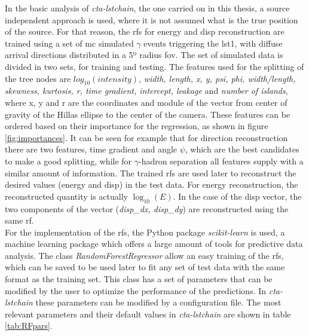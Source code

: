 \documentclass[main.tex]{subfiles}
\begin{document}
In the basic analysis of \textit{cta-lstchain}, the one carried on in this thesis, a source independent approach is used, where it is not assumed what is the true position of the source. For that reason, the \glspl{rf} for energy and disp reconstruction are trained using a set of \gls{mc} simulated $\gamma$ events triggering the \gls{lst}1, with diffuse arrival directions distributed in a 5º radius \gls{fov}. The set of simulated data is divided in two sets, for training and testing. The features used for the splitting of the tree nodes are $log_{10}(intensity)$, \textit{width, length, x, y, psi, phi, width/length, skewness, kurtosis, r, time gradient, intercept, leakage} and \textit{number of islands}, where x, y and r are the coordinates and module of the vector from center of gravity of the Hillas ellipse to the center of the camera. These features can be ordered based on their importance for the regression, as shown in figure \ref{fig:importances}. It can be seen for example that for direction reconstruction there are two features, time gradient and angle $\psi$, which are the best candidates to make a good splitting, while for $\gamma$-hadron separation all features supply with a similar amount of information. 
The trained \glspl{rf} are used later to reconstruct the desired values (energy and disp) in the test data. For energy reconstruction, the reconstructed quantity is actually $\log_{10}(E)$. In the case of the disp vector, the two components of the vector (\textit{disp\_dx, disp\_dy}) are reconstructed using the same \gls{rf}.\\
For the implementation of the \glspl{rf}, the Python package \textit{scikit-learn} \cite{2011scikit-learn} is used, a machine learning package which offers a large amount of tools for predictive data analysis. The class \textit{RandomForestRegressor} allow an easy training of the \glspl{rf}, which can be saved to be used later to fit any set of test data with the same format as the training set. This class has a set of parameters that can be modified by the user to optimize the performance of the predictions. In \textit{cta-lstchain} these parameters can be modified by a configuration file. The most relevant parameters and their default values in \textit{cta-lstchain} are shown in table \ref{tab:RFpars}. 
\end{document}
